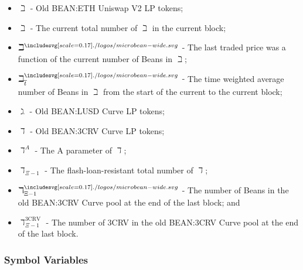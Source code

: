 \documentclass[class=article, crop=false]{standalone}
\begin{document}
\begin{itemize}[topsep=0pt, itemsep=3pt,leftmargin=16pt]
    \item[] $\beth$ - \hypertarget{ht25}{Old BEAN:ETH Uniswap V2 LP tokens};
    \item[] $\beth$ - \hypertarget{ht26}{The current total number of $\beth$ in the current block};
    \item[] $\beth^{\bean}$ - \hypertarget{ht27}{The last traded price was a function of the current number of Beans in $\beth$};
    \item[] $\beth_{\overline{t}}^{\bean}$ - \hypertarget{ht28}{The time weighted average number of Beans in $\beth$ from the start of the current  to the current block};
    \item[] $\gimel$ - \hypertarget{ht108}{Old BEAN:LUSD Curve LP tokens};
    \item[] $\daleth$ - \hypertarget{ht64}{Old BEAN:3CRV Curve LP tokens};
    \item[] $\daleth^{A}$ - \hypertarget{ht65}{The A parameter of $\daleth$};
    \item[] $\daleth_{\Xi-1}$ - \hypertarget{ht66}{The flash-loan-resistant total number of $\daleth$};
    \item[] $\daleth_{\Xi-1}^{\bean}$ - \hypertarget{ht67}{The number of Beans in the old BEAN:3CRV Curve pool at the end of the last block}; and
    \item[] $\daleth_{\Xi-1}^{\text{3CRV}}$ - \hypertarget{ht68}{The number of 3CRV in the old BEAN:3CRV Curve pool at the end of the last block}.
\end{itemize}

\subsubsection{Symbol Variables}
\end{document}

